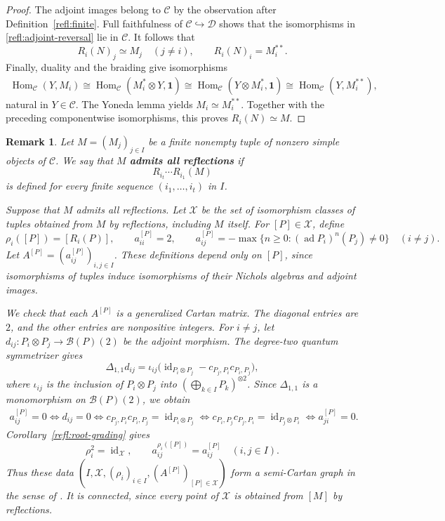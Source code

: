 \documentclass[11pt, a4paper]{article}
\numberwithin{equation}{section}
\newcommand{\C}{\mathcal C}
\newcommand{\D}{\mathcal D}
\newcommand{\B}{\mathcal B}
\newcommand{\one}{\mathbf 1}
\DeclareMathOperator{\id}{id}
\DeclareMathOperator{\ad}{ad}
\newtheorem{remark}[theorem]{Remark}
\begin{document}
\begin{proof}
The adjoint images belong to $\C$  { by the observation after
Definition~\ref{refl:finite}.
Full faithfulness} of $\C\hookrightarrow\D$  {shows that} the
isomorphisms  { in \eqref{refl:adjoint-reversal} lie} in $\C$.
It follows that
\[
 R_i(N)_j\simeq M_j\quad(j\neq i),
 \qquad
 R_i(N)_i=M_i^{**}.
\]
Finally, duality and the braiding give isomorphisms
\[
 \begin{aligned}
 \operatorname{Hom}_{\C}(Y,M_i)
 \cong\operatorname{Hom}_{\C}(M_i^*\otimes Y,\one)
 \cong\operatorname{Hom}_{\C}(Y\otimes M_i^*,\one)
 \cong\operatorname{Hom}_{\C}(Y,M_i^{**}),
 \end{aligned}
\]
natural in $Y\in\C$.
The Yoneda lemma yields $M_i\simeq M_i^{**}$.
Together with the preceding componentwise isomorphisms,
this proves $R_i(N)\simeq M$.

\end{proof}
\begin{remark}\label{refl:semi-cartan}\upshape
Let $M=(M_j)_{j\in I}$ be a finite nonempty tuple of
nonzero simple objects of $\C$.
We say that $M$  {\textbf{admits all reflections}} if
\[
 R_{i_t}\cdots R_{i_1}(M)
\]
is defined for every finite sequence $(i_1,\ldots,i_t)$ in $I$.

Suppose that $M$ admits all reflections.
Let $\mathcal X$ be the set of isomorphism classes of tuples
obtained from $M$ by reflections, including $M$ itself.
For $[P]\in\mathcal X$, define
\[
 \rho_i([P])=[R_i(P)],
 \qquad
 a_{ii}^{[P]}=2,
 \qquad
 a_{ij}^{[P]}
 =-\max\{{{n}}\geq0:(\ad P_i)^{{n}}(P_j)\neq0\}
 \quad(i\neq j).
\]
 Let $A^{[P]}=(a_{ij}^{[P]})_{i,j\in I}$.
These definitions depend only on $[P]$, since isomorphisms
of tuples induce isomorphisms of their Nichols algebras
and adjoint images.

We check that each $A^{[P]}$ is a generalized Cartan matrix.
The diagonal entries are $2$, and the other entries are
nonpositive integers.
For $i\neq j$, let
$
 d_{ij}:P_i\otimes P_j\longrightarrow\B(P)(2)
$
be the adjoint morphism.
The degree-two quantum symmetrizer gives
\[
 \Delta_{1,1}d_{ij}
 =\iota_{ij}
   \bigl(\id_{P_i\otimes P_j}
         -c_{P_j,P_i}c_{P_i,P_j}\bigr),
\]
where $\iota_{ij}$ is the inclusion of $P_i\otimes P_j$
into $(\bigoplus_{k\in I}P_k)^{\otimes2}$.
Since $\Delta_{1,1}$ is a monomorphism on $\B(P)(2)$,
 we obtain
\[
 \begin{aligned}
 a_{ij}^{[P]}=0
 \iff d_{ij}=0
 \iff c_{P_j,P_i}c_{P_i,P_j}
          =\id_{P_i\otimes P_j}
 \iff c_{P_i,P_j}c_{P_j,P_i}
          =\id_{P_j\otimes P_i}
 \iff a_{ji}^{[P]}=0.
 \end{aligned}
\]
Corollary~\ref{refl:root-grading} gives
\[
 \rho_i^2=\id_{\mathcal X},
 \qquad
 a_{ij}^{\rho_i([P])}=a_{ij}^{[P]}
 \quad(i,j\in I).
\]
Thus these data $(I,\mathcal X,(\rho_i)_{i\in I},
  (A^{[P]})_{[P]\in\mathcal X})$ form a semi-Cartan graph in the sense of
\cite[Definition~9.1.1]{rootsys}.
It is connected, since every point of $\mathcal X$
is obtained from $[M]$ by reflections.
\end{remark}
\end{document}
